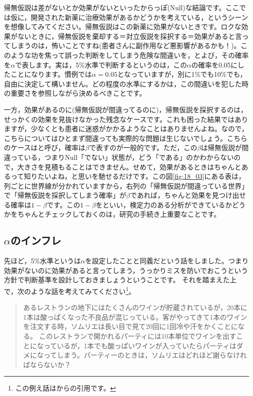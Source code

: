 \documentclass{ltjsbook}
\begin{document}
帰無仮説は差がないとか効果がないといったからっぽ(Null)な結論です。ここでは仮に，開発された新薬に治療効果があるかどうかを考えている，というシーンを想像してみてください。帰無仮説はこの新薬に効果がないときです。ロクな効果がないときに，帰無仮説を棄却する＝対立仮説を採択する＝効果があると言ってしまうのは，怖いことですね(患者さんに副作用など悪影響があるかも！)。このような功を焦って誤った判断をしてしまう危険な間違いを，とよび，その確率を$\alpha$で表します。実は，5\%水準で判断するというのは，この$\alpha$の確率を0.05にしたことになります。慣例では$\alpha=0.05$となっていますが，別に1\%でも10\%でも，自由に決定して構いません。どの程度の水準にするかは，この間違いを犯した時の重要さを参照しながら決めるべきことです。

一方，効果があるのに(帰無仮説が間違ってるのに)，帰無仮説を採択するのは，せっかくの効果を見抜けなかった残念なケースです。これも困った結果ではありますが，少なくとも患者に迷惑がかかるようなことはありませんよね。なので，こちらについてはひとまず間違っても実際的な問題は生じないでしょう。こちらのケースはと呼び，確率は$\beta$で表すのが一般的です。ただ，この$\beta$は帰無仮説が間違っている，つまりNull「でない」状態が，どう「である」のかわからないので，大きさを見積もることはできません。せめて，効果があるときはちゃんとあるって知りたいよね，と思いを馳せるだけです。この図\ref{fig:18_03}にある表は，列ごとに世界線が分かれていますから，右列の「帰無仮説が間違っている世界」で「帰無仮説を採択してしまう確率」が$\beta$であれば，ちゃんと効果を見つけ出せる確率は$1-\beta$です。この$1-\beta$をといい，検定力のある分析ができているかどうかをちゃんとチェックしておくのは，研究の手続き上重要なことです。

\subsection{$\alpha$のインフレ}
\label{alphaInfration}
先ほど，5\%水準というは$\alpha$を設定したことと同義だという話をしました。つまり効果がないのに効果があると言ってしまう，うっかりミスを防いでおこうという方針で判断基準を設計しておきましょうということです。
それを踏まえた上で，次のような話を考えてみてください\footnote{この例え話は\textcite{BA33892274}からの引用です。}。
\begin{quote}
	あるレストランの地下にはたくさんのワインが貯蔵されているが，20本に1本は酸っぱくなった不良品が混じっている。客がやってきて1本のワインを注文する時，ソムリエは長い目で見て20回に1回冷や汗をかくことになる。
	このレストランで開かれるパーティには10本単位でワインを出すことになっているが，1本でも酸っぱいワインが入っていたらパーティはダメになってしまう。パーティーのときは，ソムリエはどれほど謝らなければならないか？
\end{quote}
\end{document}
